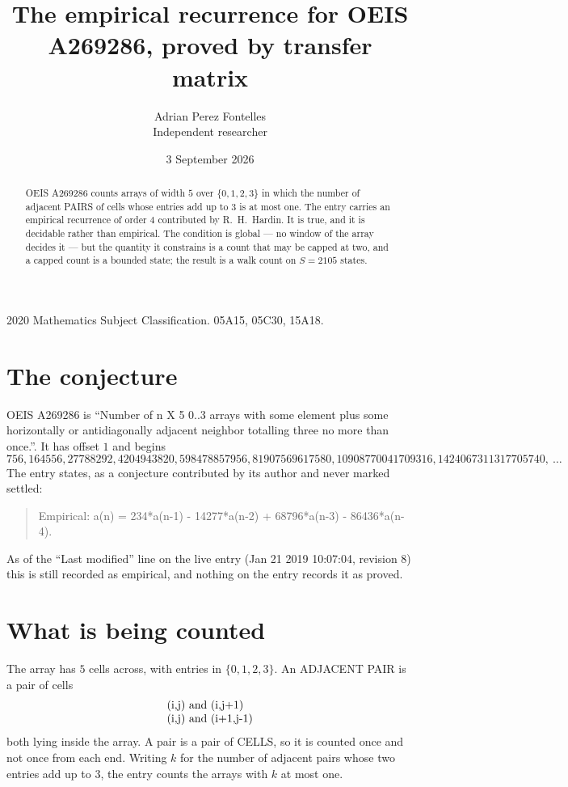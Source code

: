 \documentclass[11pt,a4paper]{article}
\title{The empirical recurrence for OEIS A269286, proved by transfer matrix}
\author{Adrian Perez Fontelles\\ \small Independent researcher}
\date{3 September 2026}
\theoremstyle{plain}
\theoremstyle{definition}
\begin{document}
\maketitle

\begin{abstract}
OEIS A269286 counts arrays of width $5$ over $\{0,1,2,3\}$ in which the number of adjacent PAIRS of
cells whose entries add up to $3$ is at most one. The entry carries an empirical recurrence of
order $4$ contributed by R.~H.~Hardin. It is true, and it is decidable rather than
empirical. The condition is global --- no window of the array decides it --- but the quantity
it constrains is a count that may be capped at two, and a capped count is a bounded state; the
result is a walk count on $S=2105$ states.
\end{abstract}

\noindent\small 2020 Mathematics Subject Classification. 05A15, 05C30, 15A18.\normalsize

\section{The conjecture}

OEIS A269286 is ``Number of n X 5 0..3 arrays with some element plus some horizontally or antidiagonally adjacent neighbor totalling three no more than once.''. It has offset $1$ and begins
\[
756, 164556, 27788292, 4204943820, 598478857956, 81907569617580, 10908770041709316, 1424067311317705740,\ \dots
\]
The entry states, as a conjecture contributed by its author and never marked settled:
\begin{quote}
Empirical: a(n) = 234*a(n-1) - 14277*a(n-2) + 68796*a(n-3) - 86436*a(n-4).
\end{quote}
As of the ``Last modified'' line on the live entry (Jan 21 2019 10:07:04, revision 8) this is still
recorded as empirical, and nothing on the entry records it as proved.

\section{What is being counted}

The array has $5$ cells across, with entries in $\{0,1,2,3\}$. An ADJACENT PAIR is a pair of cells
\[
\begin{array}{l}
$(i,j)\text{ and }(i,j{+}1)$ \\
$(i,j)\text{ and }(i{+}1,j{-}1)$ \\
\end{array}
\]
both lying inside the array. A pair is a pair of CELLS, so it is counted once and not once from
each end. Writing $k$ for the number of adjacent pairs whose two entries add up to $3$, the
entry counts the arrays with $k$ at most one.
\end{document}
